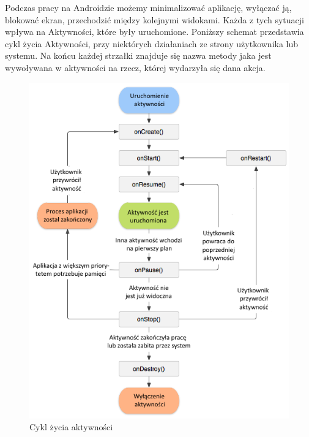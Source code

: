 \par
Podczas pracy na Androidzie możemy minimalizować aplikację, wyłączać ją, blokować ekran, przechodzić między kolejnymi widokami. Każda z tych sytuacji wpływa na Aktywności, które były uruchomione. Poniższy schemat przedstawia cykl życia Aktywności, przy niektórych działaniach ze strony użytkownika lub systemu. Na końcu każdej strzałki znajduje się nazwa metody jaka jest wywoływana w aktywności na rzecz, której wydarzyła się dana akcja.
\begin{figure}[H]
\includegraphics[scale=0.9]{imgs/activity_lifecycle_pl.png}
\caption{Cykl życia aktywności\cite{activity}}
\end{figure}

